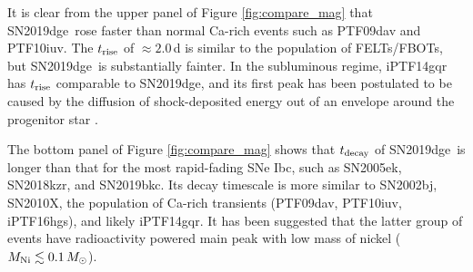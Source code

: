 \documentclass[twocolumn]{aastex63}
\newcommand{\name}{SN2019dge}
\begin{document}
\begin{CJK*}{UTF8}{gbsn}
It is clear from the upper panel of Figure \ref{fig:compare_mag} that \name\ rose faster than normal 
Ca-rich events such as PTF09dav and PTF10iuv. The $t_{\rm rise}$ of $\approx 2.0$\,d is similar to 
the population of FELTs/FBOTs, but \name\ is substantially fainter. In the subluminous regime, 
iPTF14gqr has $t_{\rm rise}$ comparable to \name, and its first peak has been postulated to be caused 
by the diffusion of shock-deposited energy out of an envelope around the progenitor star 
\citep{De2018}.
 
The bottom panel of Figure \ref{fig:compare_mag} shows that $t_{\rm decay}$ of \name\ is 
longer than that for the most rapid-fading SNe Ibc, such as SN2005ek, SN2018kzr, 
and SN2019bkc. Its decay timescale is more similar to SN2002bj, SN2010X, the population of Ca-rich 
transients (PTF09dav, PTF10iuv, iPTF16hgs), and likely iPTF14gqr. It has been suggested that the latter 
group of events have radioactivity powered main peak with low mass of nickel ($M_{\rm Ni} \lesssim 0.1 
\,M_\odot$).


\end{CJK*}
\end{document}
